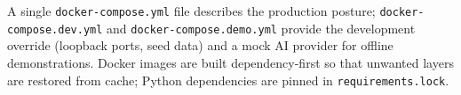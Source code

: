 A single \texttt{docker-\hspace{0pt}compose.\hspace{0pt}yml} file describes
the production posture; \texttt{docker-\hspace{0pt}compose.\hspace{0pt}dev.\hspace{0pt}yml}
and \texttt{docker-\hspace{0pt}compose.\hspace{0pt}demo.\hspace{0pt}yml}
provide the development override (loopback ports, seed data) and a mock AI
provider for offline demonstrations. Docker images are built dependency-first
so that unwanted layers are restored from cache; Python dependencies are
pinned in \texttt{requirements.\hspace{0pt}lock}.